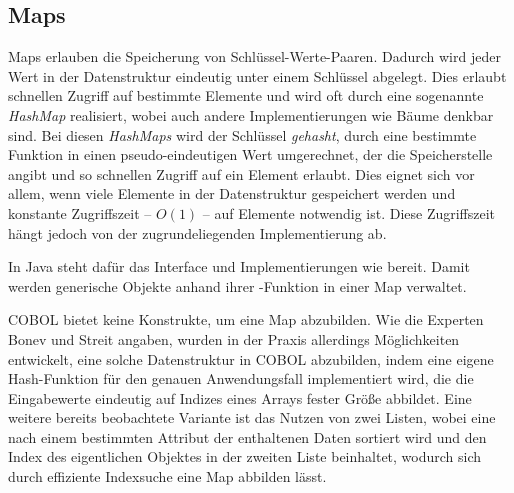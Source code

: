 \subsection{Maps}
Maps erlauben die Speicherung von Schlüssel-Werte-Paaren. Dadurch wird jeder Wert in der Datenstruktur eindeutig unter einem Schlüssel abgelegt. Dies erlaubt schnellen Zugriff auf bestimmte Elemente und wird oft durch eine sogenannte \textit{HashMap} realisiert, wobei auch andere Implementierungen wie Bäume denkbar sind. Bei diesen \textit{HashMaps} wird der Schlüssel \textit{gehasht}, \dahe durch eine bestimmte Funktion in einen pseudo-eindeutigen Wert umgerechnet, der die Speicherstelle angibt und so schnellen Zugriff auf ein Element erlaubt. Dies eignet sich vor allem, wenn viele Elemente in der Datenstruktur gespeichert werden und konstante Zugriffszeit -- $O(1)$ -- auf Elemente notwendig ist. Diese Zugriffszeit hängt jedoch von der zugrundeliegenden Implementierung ab.

In Java steht dafür das Interface  und Implementierungen wie  bereit. Damit werden generische Objekte anhand ihrer -Funktion in einer Map verwaltet. 

COBOL bietet keine Konstrukte, um eine Map abzubilden. Wie die Experten Bonev und Streit angaben, wurden in der Praxis allerdings Möglichkeiten entwickelt, eine solche Datenstruktur in COBOL abzubilden, indem \zB eine eigene Hash-Funktion für den genauen Anwendungsfall implementiert wird, die die Eingabewerte eindeutig auf Indizes eines Arrays fester Größe abbildet. Eine weitere bereits beobachtete Variante ist das Nutzen von zwei Listen, wobei eine nach einem bestimmten Attribut der enthaltenen Daten sortiert wird und den Index des eigentlichen Objektes in der zweiten Liste beinhaltet, wodurch sich durch effiziente Indexsuche eine Map abbilden lässt.